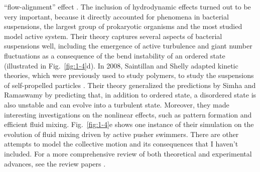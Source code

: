 ``flow-alignment'' effect \cite{Forster1975}. The inclusion of hydrodynamic effects turned out to be very important, because it directly accounted for phenomena in bacterial suspensions, the largest group of prokaryotic organisms and the most studied model active system. Their theory captures several aspects of bacterial suspensions well, including the emergence of active turbulence and giant number fluctuations as a consequence of the bend instability of an ordered state (illustrated in Fig.~\ref{fig:1-4}d). In 2008, Saintillan and Shelly adapted kinetic theories, which were previously used to study polymers, to study the suspensions of self-propelled particles \cite{Saintillan2008a, Saintillan2008b}. Their theory generalized the predictions by Simha and Ramaswamy by predicting that, in addition to ordered state, a disordered state is also unstable and can evolve into a turbulent state. Moreover, they made interesting investigations on the nonlinear effects, such as pattern formation and efficient fluid mixing. Fig.~\ref{fig:1-4}e shows one instance of their simulation on the evolution of fluid mixing driven by active pusher swimmers. There are other attempts to model the collective motion and its consequences that I haven't included. For a more comprehensive review of both theoretical and experimental advances, see the review papers
\cite{Ramaswamy2010, Koch2011, Marchetti2013}.

